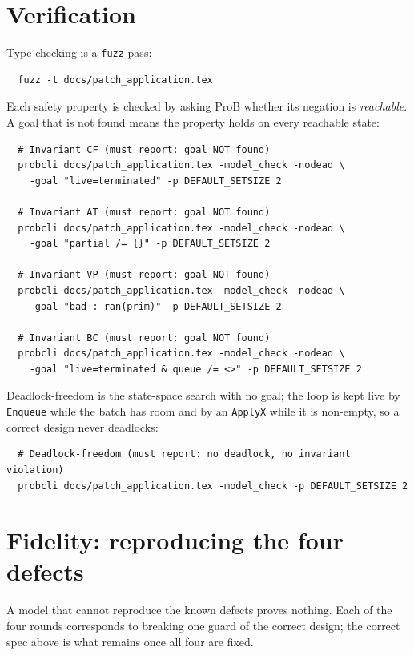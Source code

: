 \documentclass[a4paper,10pt,fleqn]{article}
\begin{document}
\section{Verification}
\label{sec:verify}

Type-checking is a \texttt{fuzz} pass:
\begin{verbatim}
  fuzz -t docs/patch_application.tex
\end{verbatim}

Each safety property is checked by asking ProB whether its negation is
\emph{reachable}.  A goal that is not found means the property holds on
every reachable state:
\begin{verbatim}
  # Invariant CF (must report: goal NOT found)
  probcli docs/patch_application.tex -model_check -nodead \
    -goal "live=terminated" -p DEFAULT_SETSIZE 2

  # Invariant AT (must report: goal NOT found)
  probcli docs/patch_application.tex -model_check -nodead \
    -goal "partial /= {}" -p DEFAULT_SETSIZE 2

  # Invariant VP (must report: goal NOT found)
  probcli docs/patch_application.tex -model_check -nodead \
    -goal "bad : ran(prim)" -p DEFAULT_SETSIZE 2

  # Invariant BC (must report: goal NOT found)
  probcli docs/patch_application.tex -model_check -nodead \
    -goal "live=terminated & queue /= <>" -p DEFAULT_SETSIZE 2
\end{verbatim}

Deadlock-freedom is the state-space search with no goal; the loop is kept
live by \texttt{Enqueue} while the batch has room and by an
\texttt{ApplyX} while it is non-empty, so a correct design never deadlocks:
\begin{verbatim}
  # Deadlock-freedom (must report: no deadlock, no invariant violation)
  probcli docs/patch_application.tex -model_check -p DEFAULT_SETSIZE 2
\end{verbatim}

\section{Fidelity: reproducing the four defects}
\label{sec:fidelity}

A model that cannot reproduce the known defects proves nothing.  Each of
the four rounds corresponds to breaking one guard of the correct design;
the correct spec above is what remains once all four are fixed.
\end{document}
